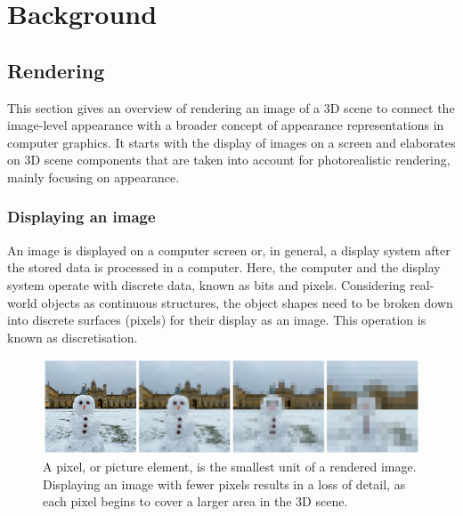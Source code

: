 \chapter{Background}

\section{Rendering}

This section gives an overview of rendering an image of a 3D scene to connect the image-level appearance with a broader concept of appearance representations in computer graphics.  It starts with the display of images on a screen and elaborates on 3D scene components that are taken into account for photorealistic rendering, mainly focusing on appearance. 

\subsection{Displaying an image}
An image is displayed on a computer screen or, in general, a display system after the stored data is processed in a computer. Here, the computer and the display system operate with discrete data, known as bits and pixels. Considering real-world objects as continuous structures, the object shapes need to be broken down into discrete surfaces (pixels) for their display as an image. This operation is known as discretisation. 

\begin{figure}[ht]
  \centering

    \includegraphics[width=\linewidth]{Images/pixelate_image_snowman.png}

   \caption{A pixel, or picture element, is the smallest unit of a rendered image. Displaying an image with fewer pixels results in a loss of detail, as each pixel begins to cover a larger area in the 3D scene.}
   \label{fig:colour-approximate}
\end{figure}

